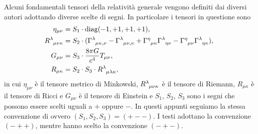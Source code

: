 Alcuni fondamentali tensori della relatività generale vengono definiti dai
diversi autori adottando diverse scelte di segni.  In particolare i tensori in
questione sono
\begin{subequations}
  \label{eq:convenzione-segni}
  \begin{align}
    \eta_{\mu\nu} &= S_{1} \cdot \diag(-1,+1,+1,+1), \\
    \tensor{R}{^{\lambda}_{\mu\nu\kappa}} &= S_{2} \cdot
    (\tensor{\Gamma}{^{\lambda}_{\mu\kappa,\nu}} -
    \tensor{\Gamma}{^{\lambda}_{\mu\nu,\kappa}} +
    \tensor{\Gamma}{^{\eta}_{\mu\kappa}} \tensor{\Gamma}{^{\lambda}_{\eta\nu}} -
    \tensor{\Gamma}{^{\eta}_{\mu\nu}}
    \tensor{\Gamma}{^{\lambda}_{\eta\kappa}}), \\
    G_{\mu\nu} &= S_{3} \cdot \frac{8\pi G}{c^{4}} T_{\mu\nu}, \\
    R_{\mu\kappa} &= S_{2} \cdot S_{3} \cdot
    \tensor{R}{^{\lambda}_{\mu\lambda\kappa}},
  \end{align}
\end{subequations}
in cui $\eta_{\mu\nu}$ è il tensore metrico di Minkowski,
$\tensor{R}{^{\lambda}_{\mu\nu\kappa}}$ è il tensore di Riemann, $R_{\mu\kappa}$
è il tensore di Ricci e $G_{\mu\nu}$ è il tensore di Einstein e $S_{1}$,
$S_{2}$, $S_{3}$ sono i segni che possono essere scelti uguali a $+$ oppure $-$.
In questi appunti seguiamo la stessa convenzione di
\textcite{weinberg:gravitation} ovvero $(S_{1}, S_{2}, S_{3}) = (+--)$.  I testi
\textcites{barone:relativita,landau:campo} adottano la convenzione $(-++)$,
mentre \textcite{ohanian:gravitazione} hanno scelto la convenzione $(-+-)$.

